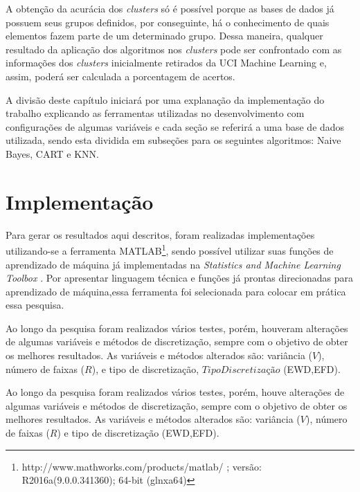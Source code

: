 A obtenção da acurácia dos \textit{clusters} só é possível porque as bases de dados já possuem seus grupos definidos, por conseguinte, há o conhecimento de quais elementos fazem parte de um determinado grupo. Dessa maneira, qualquer resultado da aplicação dos algoritmos nos \textit{clusters} pode ser confrontado com as informações dos \textit{clusters} inicialmente retirados da UCI Machine Learning e, assim, poderá ser calculada a porcentagem de acertos. 

A divisão deste capítulo iniciará por uma explanação da implementação do trabalho explicando as ferramentas utilizadas no desenvolvimento com configurações de algumas variáveis e cada seção se referirá a uma base de dados utilizada, sendo esta dividida em subseções para os seguintes algoritmos: Naive Bayes, CART e KNN.

\section{Implementação}\label{cap:resultados:sec:implement}



Para gerar os resultados aqui descritos, foram realizadas implementações utilizando-se a ferramenta MATLAB\footnote{http://www.mathworks.com/products/matlab/ ; versão: R2016a(9.0.0.341360); 64-bit (glnxa64)}, sendo possível utilizar suas funções de aprendizado de máquina já implementadas na \textit{Statistics and Machine Learning Toolbox} . Por apresentar linguagem técnica e funções já prontas direcionadas para aprendizado de máquina,essa ferramenta foi selecionada para colocar em prática essa pesquisa.

Ao longo da pesquisa foram realizados vários testes, porém, houveram alterações de algumas variáveis e métodos de discretização, sempre com o objetivo de obter os melhores resultados. As variáveis e métodos alterados são: variância (${V}$), número de faixas (${R}$), e tipo de discretização, ${TipoDiscretização}$ (EWD,EFD). 

Ao longo da pesquisa foram realizados vários testes, porém, houve alterações de algumas variáveis e métodos de discretização, sempre com o objetivo de obter os melhores resultados. As variáveis e métodos alterados são: variância (${V}$), número de faixas (${R}$) e tipo de discretização (EWD,EFD). 


